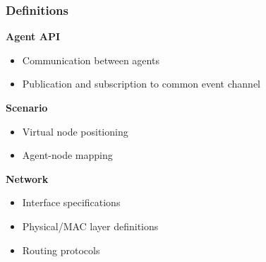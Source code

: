 \documentclass[mathserif]{beamer}
\begin{document}
\frame
{
    \frametitle{Definitions}
    \textbf{Agent API}
    \begin{itemize}
        \item Communication between agents
        \item Publication and subscription to common event channel
    \end{itemize}

    \textbf{Scenario}
    \begin{itemize}
        \item Virtual node positioning
        \item Agent-node mapping
    \end{itemize}

    \textbf{Network}
    \begin{itemize}
        \item Interface specifications
        \item Physical/MAC layer definitions
        \item Routing protocols
    \end{itemize}
}
\end{document}
